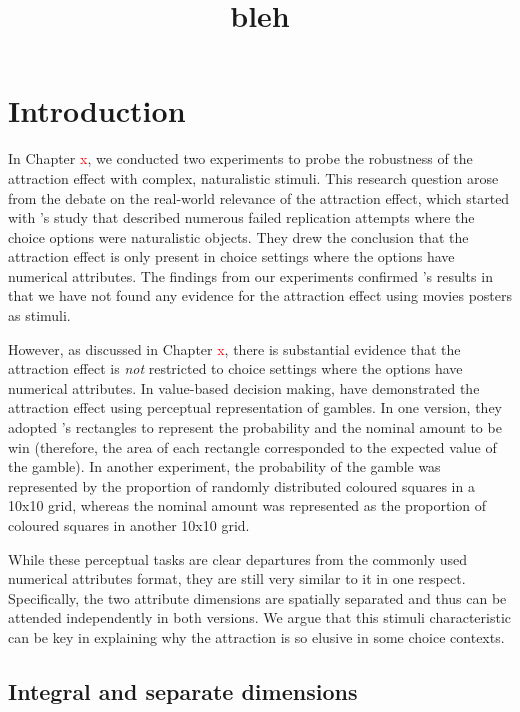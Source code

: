 \documentclass[11pt,a4paper]{article}
\date{}
\title{\huge{bleh}}
\begin{document}
\maketitle


\section{Introduction} 

In Chapter \textcolor{red}{x}, we conducted two experiments to probe the robustness of the attraction effect with complex, naturalistic stimuli. This research question arose from the debate on the real-world relevance of the attraction effect, which started with \citeauthor{Frederick2014a}'s study that described numerous failed replication attempts where the choice options were naturalistic objects. They drew the conclusion that the attraction effect is only present in choice settings where the options have numerical attributes. The findings from our experiments confirmed \citeauthor{Frederick2014a}'s results in that we have not found any evidence for the attraction effect using movies posters as stimuli.

However, as discussed in Chapter \textcolor{red}{x}, there is substantial evidence that the attraction effect is \textit{not} restricted to choice settings where the options have numerical attributes. In value-based decision making,  have demonstrated the attraction effect using perceptual representation of gambles. In one version, they adopted \citeauthor{Trueblood2013}'s rectangles to represent the probability and the nominal amount to be win (therefore, the area of each rectangle corresponded to the expected value of the gamble). In another experiment, the probability of the gamble was represented by the proportion of randomly distributed coloured squares in a 10x10 grid, whereas the nominal amount was represented as the proportion of coloured squares in another 10x10 grid. 

While these perceptual tasks are clear departures from the commonly used numerical attributes format, they are still very similar to it in one respect. Specifically, the two attribute dimensions are spatially separated and thus can be attended independently in both versions. We argue that this stimuli characteristic can be key in explaining why the attraction is so elusive in some choice contexts.

\subsection{Integral and separate dimensions} 
\end{document}
